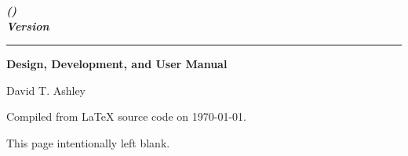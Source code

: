 \thispagestyle{empty}

\begin{flushright}
\vspace*{0mm}
\huge\bfseries
\emph{\productbasenamelong{} (\productbasenameshort{})}\\
\emph{Version \productversion{}}\\
\end{flushright}
\vspace{0.0cm}
\noindent\rule{\textwidth}{2pt}
\begin{flushright}
\LARGE\bfseries
Design, Development, and User Manual
\end{flushright}
\vfill
\begin{flushright}
\begin{small}
David T. Ashley
\end{small}
\end{flushright}
\vspace{0.2cm}
\begin{flushright}
\begin{small}
Compiled from \LaTeX{} source code on \today .  
\end{small}
\end{flushright}

\pagebreak
\thispagestyle{empty}
\begin{centering}
This page intentionally left blank.
\end{centering}
\vfill
